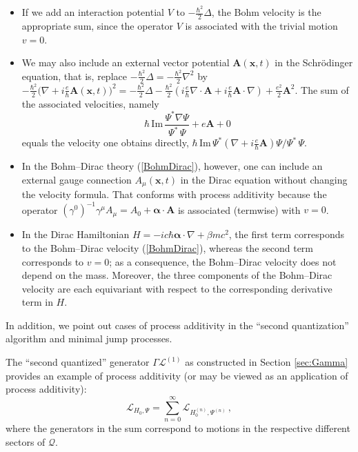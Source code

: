 \documentclass[12pt]{article}
\newcommand{\I}{i} %
\newcommand{\1}{\mathbf{1}} %
\newcommand{\Laplace}{\Delta} %
\renewcommand{\Im}{\mathrm{Im}} %
\newcommand{\conf}{\mathcal{Q}} %
\newcommand{\generator}{\mathscr{L}} %
\newcommand{\vx}{{\boldsymbol x}} %
\newcommand{\vA}{{\boldsymbol A}}
\newcommand{\valpha}{{\boldsymbol \alpha}}
\begin{document}
\begin{itemize}
\item If we add an interaction potential $V$ to $-\frac{\hbar^2}{2}
   \Laplace$, the Bohm velocity is the appropriate sum, since the
   operator $V$ is associated with the trivial motion $v=0$.

\item We may also include an external vector potential $\vA(\vx,t)$ in
   the Schr\"odinger equation, that is, replace $- \frac{\hbar^2}{2}
   \Laplace = - \frac{\hbar^2}{2} \nabla^2$ by $- \frac{\hbar^2}{2}
   \big( \nabla + \I \frac{e}{\hbar} \vA(\vx,t) \big)^2 = -
   \frac{\hbar^2}{2} \Laplace - \frac{\hbar^2}{2} (\I \frac{e}{\hbar}
   \nabla\cdot\vA + \I \frac{e}{\hbar} \vA \cdot \nabla) +
   \frac{e^2}{2} \vA^2$. The sum of the associated velocities, namely
   \[
     \hbar \, \Im \, \frac{\Psi^* \nabla \Psi}{\Psi^* \, \Psi} + e\vA +
     0
   \]
   equals the velocity one obtains directly, $\hbar \, \Im \, \Psi^*
   (\nabla +\I \frac{e}{\hbar} \vA)\Psi/ \Psi^* \, \Psi$.

\item In the Bohm--Dirac theory (\ref{BohmDirac}), however, one can
   include an external gauge connection $A_\mu(\vx,t)$ in the Dirac
   equation without changing the velocity formula. That conforms with
   process additivity because the operator $(\gamma^0)^{-1} \gamma^\mu
   A_\mu = A_0+\boldsymbol{\alpha}\cdot\vA$ is associated (termwise)
   with $v=0$.

\item In the Dirac Hamiltonian $H = -\I c \hbar \valpha \cdot \nabla +
   \beta mc^2$, the first term corresponds to the Bohm--Dirac velocity
   (\ref{BohmDirac}), whereas the second term corresponds to $v=0$; as
   a consequence, the Bohm--Dirac velocity does not depend on the mass.
   Moreover, the three components of the Bohm--Dirac velocity are each
   equivariant with respect to the corresponding derivative term in
   $H$.
\end{itemize}

In addition, we point out cases of process additivity in the ``second
quantization'' algorithm and minimal jump processes.


The ``second quantized'' generator $\Gamma \generator^{(1)}$ as
constructed in Section \ref{sec:Gamma} provides an example of
process additivity (or may be viewed as an application of process
additivity):
\[
   \generator_{H_0, \Psi}= \sum_{n=0}^{\infty}
   \generator_{H_0^{(n)}, \Psi^{(n)}} \,,
\]
where the generators in the sum correspond to motions in the
respective different sectors of $\conf$.
\end{document}
